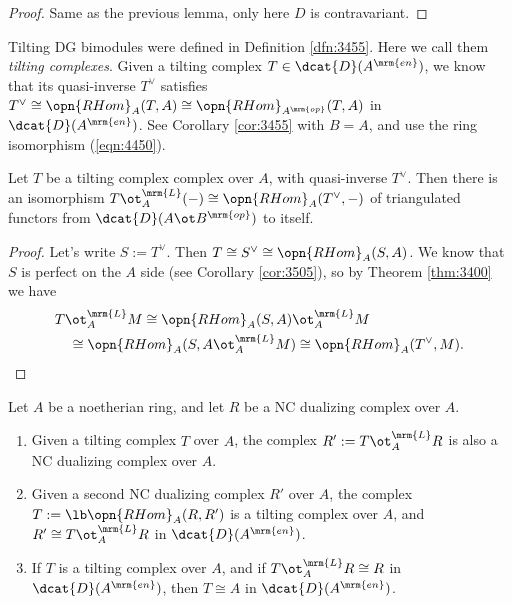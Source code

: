 \begin{proof}
Same as the previous lemma, only here $D$ is contravariant. 
\end{proof}

Tilting DG bimodules were defined in Definition \ref{dfn:3455}. Here we call 
them {\em tilting complexes}. 
Given a tilting complex $T \in \dcat{D}(A^{\mrm{en}})$, we know that its 
quasi-inverse $T^{\vee}$ satisfies
$T^{\vee} \cong \opn{RHom}_{A}(T, A) \cong  \opn{RHom}_{A^{\mrm{op}}}(T, A)$ 
in $\dcat{D}(A^{\mrm{en}})$. See Corollary \ref{cor:3455} with $B = A$,
and use the ring isomorphism (\ref{eqn:4450}). 

\begin{lem} \label{lem:4350}
Let $T$ be a tilting complex complex over $A$, with 
quasi-inverse $T^{\vee}$. Then there is an isomorphism 
$T \ot^{\mrm{L}}_{A} (-) \cong \opn{RHom}_{A}(T^{\vee}, -)$
of triangulated functors from 
$\dcat{D}(A \ot B^{\mrm{op}})$ to itself. 
\end{lem}

\begin{proof}
Let's write $S := T^{\vee}$. Then 
$T \cong S^{\vee} \cong \opn{RHom}_{A}(S, A)$. 
We know that $S$ is perfect on the $A$ side (see Corollary \ref{cor:3505}),
so by Theorem \ref{thm:3400} we have 
\begin{align*}
&
T \ot^{\mrm{L}}_{A} M \cong \opn{RHom}_{A}(S, A) \ot^{\mrm{L}}_{A} M 
\\ & \quad 
\cong \opn{RHom}_{A}(S, A \ot^{\mrm{L}}_{A} M) \cong 
\opn{RHom}_{A}(T^{\vee}, M)  . \qedhere
\end{align*} 
\end{proof}

\begin{thm}[\cite{Ye4}] \label{thm:3681}
Let $A$ be a noetherian ring, and let $R$ be a NC dualizing complex over $A$. 
\begin{enumerate}
\item Given a tilting complex $T$ over $A$, the complex
$R' := T \ot^{\mrm{L}}_{A} R$ 
is also a NC dualizing complex over $A$. 

\item Given a second NC dualizing complex $R'$ over $A$, the complex 
$T := \lb \opn{RHom}_A(R, R')$ 
is a tilting complex over $A$, and 
$R' \cong T \ot^{\mrm{L}}_{A} R$
in $\dcat{D}(A^{\mrm{en}})$. 

\item If $T$ is a tilting complex over $A$, and if
$T \ot^{\mrm{L}}_{A} R \cong R$ 
in $\dcat{D}(A^{\mrm{en}})$,  
then $T \cong A$ in $\dcat{D}(A^{\mrm{en}})$.
\end{enumerate}
\end{thm}

